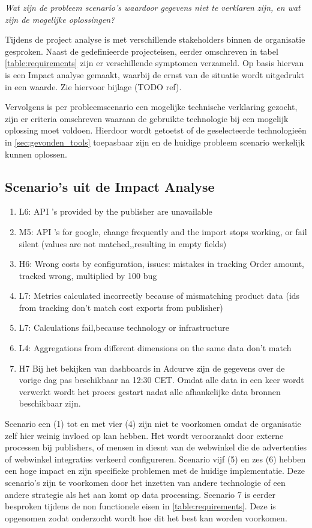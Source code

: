 \textit{Wat zijn de probleem scenario's waardoor gegevens niet te verklaren zijn, en wat zijn de mogelijke oplossingen?}

Tijdens de project analyse is met verschillende stakeholders binnen de organisatie gesproken. Naast de gedefinieerde projecteisen, eerder omschreven in tabel \ref{table:requirements} zijn er verschillende symptomen verzameld. Op basis hiervan is een Impact analyse gemaakt, waarbij de ernst van de situatie wordt uitgedrukt in een waarde. Zie hiervoor bijlage (TODO ref).

Vervolgens is per probleemscenario een mogelijke technische verklaring gezocht, zijn er criteria omschreven waaraan de gebruikte technologie bij een mogelijk oplossing moet voldoen. Hierdoor wordt getoetst of de geselecteerde technologieën in \ref{sec:gevonden_tools} toepasbaar zijn en de huidige probleem scenario werkelijk kunnen oplossen.

\subsection{Scenario's uit de Impact Analyse}

\begin{enumerate}
    \item L6: API 's provided by the publisher are unavailable
    \item M5: API 's for google, change frequently and the import stops working, or fail silent (values are not matched,,resulting in empty fields)
    \item H6: Wrong costs by configuration, issues: mistakes in tracking Order amount, tracked wrong, multiplied by 100 bug
    \item L7: Metrics calculated incorrectly because of mismatching product data (ids from tracking don't match cost exports from publisher)
    \item L7: Calculations fail,because technology or infrastructure 
    \item L4: Aggregations from different dimensions on the same data
    don't match
    \item H7 Bij het bekijken van dashboards in Adcurve zijn de gegevens over de vorige dag pas beschikbaar na 12:30 CET. Omdat alle data in een keer wordt verwerkt wordt het proces gestart nadat alle afhankelijke data bronnen beschikbaar zijn.
\end{enumerate}

Scenario een (1) tot en met vier (4) zijn niet te voorkomen omdat de organisatie zelf hier weinig invloed op kan hebben. Het wordt veroorzaakt door externe processen bij publishers, of mensen in diesnt van de webwinkel die de advertenties of webwinkel integraties verkeerd configureren. Scenario vijf (5) en zes (6) hebben een hoge impact en zijn specifieke problemen met de huidige implementatie. Deze scenario's zijn te voorkomen door het inzetten van andere technologie of een andere strategie als het aan komt op data processing.
Scenario 7 is eerder besproken tijdens de non functionele eisen in \ref{table:requirements}. Deze is opgenomen zodat onderzocht wordt hoe dit het best kan worden voorkomen.  

